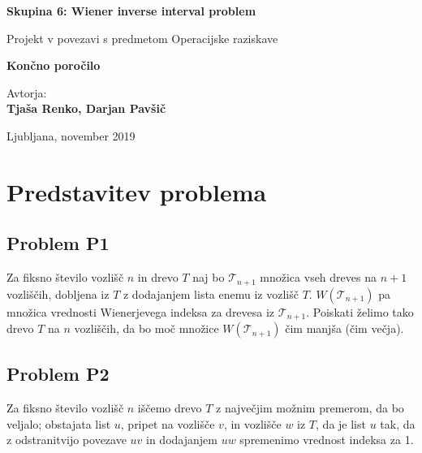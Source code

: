 \documentclass[a4paper, 12 pt]{article}
\begin{document}
\begin{titlepage}

\begin{center}



\Huge
\textbf{Skupina 6: Wiener inverse interval problem}

\vspace{0.5cm}
\large{Projekt v povezavi s predmetom Operacijske raziskave}

\vspace{2.5cm}
\Large
\textbf{Končno poročilo}

\vspace{2.5cm}
\large
Avtorja: \\
\textbf{Tjaša Renko, Darjan Pavšič}

\vfill

\large{Ljubljana, november 2019}


\end{center}
\end{titlepage}


\tableofcontents

\vspace{1cm}

\listoffigures

\pagebreak

\section{Predstavitev problema}

\subsection{Problem P1}

Za fiksno število vozlišč $n$ in drevo $T$ naj bo $\mathscr{T}_{n+1}$ množica vseh dreves na $n+1$ vozliščih, dobljena iz $T$ z dodajanjem lista enemu iz vozlišč $T$. $W(\mathscr{T}_{n+1})$ pa množica vrednosti Wienerjevega indeksa za drevesa iz $\mathscr{T}_{n+1}$. Poiskati želimo tako drevo $T$ na $n$ vozliščih, da bo moč množice $W(\mathscr{T}_{n+1})$ čim manjša (čim večja).


\subsection{Problem P2}

Za fiksno število vozlišč $n$ iščemo drevo $T$ z največjim možnim premerom, da bo veljalo; obstajata list $u$, pripet na vozlišče $v$, in vozlišče $w$ iz $T$, da je list $u$ tak, da z odstranitvijo povezave $uv$ in dodajanjem $uw$ spremenimo vrednost indeksa za 1.
\end{document}
